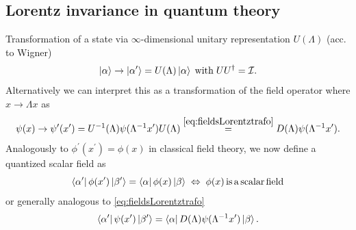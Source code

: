 \subsection{Lorentz invariance in quantum theory}
Transformation of a state via $\infty$-dimensional unitary representation $U(\Lambda)$ (acc. to Wigner)
\begin{equation}
	\ket{\alpha}\rightarrow \ket{\alpha^\prime} = U(\Lambda) \ket{\alpha} \;\mathrm{with}\; UU^\dagger = \mathcal{I}.
\end{equation}
Alternatively we can interpret this as a transformation of the field operator where $x\rightarrow\Lambda x$ as
\begin{equation}
	\psi(x) \rightarrow \psi^\prime(x^\prime) = U^{-1}(\Lambda)\psi(\Lambda^{-1} x^\prime) U(\Lambda) \stackrel{\ref{eq:fieldsLorentztrafo}}{=} D(\Lambda) \psi(\Lambda^{-1}x^\prime).
\end{equation}
Analogously to $\phi^\prime(x^\prime) = \phi(x)$ in classical field theory, we now define a quantized scalar field as
\begin{equation}
	\bra{\alpha^\prime}\phi(x^\prime) \ket{\beta^\prime} = \bra{\alpha} \phi(x) \ket{\beta} \; \Leftrightarrow\; \phi(x) \mathrm{\,is\,a\,scalar\,field}
\end{equation}
or generally analogous to  \ref{eq:fieldsLorentztrafo}
\begin{equation}
	\bra{\alpha^\prime}\psi(x^\prime)\ket{\beta^\prime} = \bra{\alpha}D(\Lambda) \psi(\Lambda^{-1} x^\prime)\ket{\beta}.
\end{equation}

